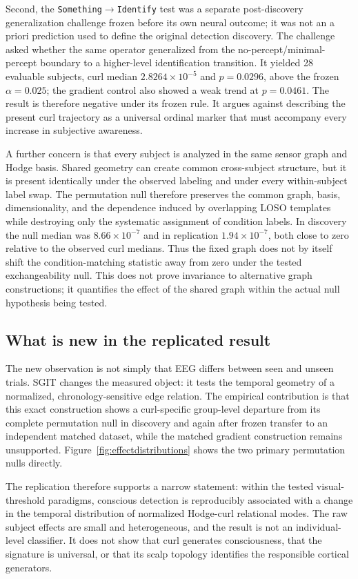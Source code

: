 \documentclass[12pt]{article}
\begin{document}
Second, the \texttt{Something}$\rightarrow$\texttt{Identify} test was a separate post-discovery generalization challenge frozen before its own neural outcome; it was not an a priori prediction used to define the original detection discovery. The challenge asked whether the same operator generalized from the no-percept/minimal-percept boundary to a higher-level identification transition. It yielded 28 evaluable subjects, curl median $2.8264\times10^{-5}$ and $p=0.0296$, above the frozen $\alpha=0.025$; the gradient control also showed a weak trend at $p=0.0461$. The result is therefore negative under its frozen rule. It argues against describing the present curl trajectory as a universal ordinal marker that must accompany every increase in subjective awareness.

A further concern is that every subject is analyzed in the same sensor graph and Hodge basis. Shared geometry can create common cross-subject structure, but it is present identically under the observed labeling and under every within-subject label swap. The permutation null therefore preserves the common graph, basis, dimensionality, and the dependence induced by overlapping LOSO templates while destroying only the systematic assignment of condition labels. In discovery the null median was $8.66\times10^{-7}$ and in replication $1.94\times10^{-7}$, both close to zero relative to the observed curl medians. Thus the fixed graph does not by itself shift the condition-matching statistic away from zero under the tested exchangeability null. This does not prove invariance to alternative graph constructions; it quantifies the effect of the shared graph within the actual null hypothesis being tested.

\subsection{What is new in the replicated result}
The new observation is not simply that EEG differs between seen and unseen trials. SGIT changes the measured object: it tests the temporal geometry of a normalized, chronology-sensitive edge relation. The empirical contribution is that this exact construction shows a curl-specific group-level departure from its complete permutation null in discovery and again after frozen transfer to an independent matched dataset, while the matched gradient construction remains unsupported. Figure~\ref{fig:effectdistributions} shows the two primary permutation nulls directly.

The replication therefore supports a narrow statement: within the tested visual-threshold paradigms, conscious detection is reproducibly associated with a change in the temporal distribution of normalized Hodge-curl relational modes. The raw subject effects are small and heterogeneous, and the result is not an individual-level classifier. It does not show that curl generates consciousness, that the signature is universal, or that its scalp topology identifies the responsible cortical generators.
\end{document}
